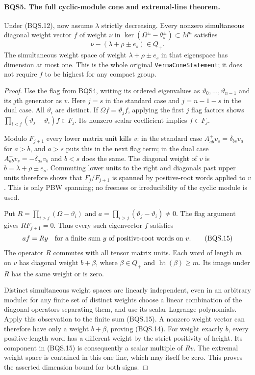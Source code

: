 \documentclass[11pt,a4paper]{article}
\numberwithin{equation}{section}
\theoremstyle{remark}\newtheorem{remark}[theorem]{Remark}
\begin{document}
\paragraph{BQS5. The full cyclic-module cone and extremal-line theorem.}
\label{claim:BQS5}
Under (BQS.12), now assume $\lambda$ strictly decreasing.  Every
nonzero simultaneous diagonal weight vector $f$ of weight $\nu$ in
$\ker(\Omega^\pm-\theta_s^\pm)\subset M^n$ satisfies
\[
              \nu-(\lambda+\rho\pm e_s)\in Q_+.
 \tag{BQS.14}
\]
The simultaneous weight space of weight $\lambda+\rho\pm e_s$ in
that eigenspace has dimension at most one.  This is the whole original
\texttt{Verma\allowbreak Cone\allowbreak Statement}; it does not require $f$ to be highest
for any compact group.

\begin{proof}
Use the flag from BQS4, writing its ordered eigenvalues as
$\vartheta_0,\ldots,\vartheta_{n-1}$ and its $j$th generator as $v$.
Here $j=s$ in the standard case and $j=n-1-s$ in the dual case.
All $\vartheta_i$ are distinct.  If $\Omega f=\vartheta_j f$,
applying the first $j$ flag factors shows
$\prod_{i<j}(\vartheta_j-\vartheta_i)f\in F_j$.
Its nonzero scalar coefficient implies $f\in F_j$.

Modulo $F_{j+1}$ every lower matrix unit kills $v$:
in the standard case $A^+_{ab}v_s=\delta_{bs}v_a$ for $a>b$,
and $a>s$ puts this in the next flag term; in the dual case
$A^-_{ab}v_s=-\delta_{as}v_b$ and $b<s$ does the same.
The diagonal weight of $v$ is $b=\lambda+\rho\pm e_s$.
Commuting lower units to the right and diagonals past upper units
therefore shows that $F_j/F_{j+1}$ is spanned by positive-root
words applied to $v$.  This is only PBW spanning; no freeness or
irreducibility of the cyclic module is used.

Put $R=\prod_{i>j}(\Omega-\vartheta_i)$ and
$a=\prod_{i>j}(\vartheta_j-\vartheta_i)\ne0$.
The flag argument gives $R F_{j+1}=0$.  Thus every such eigenvector
$f$ satisfies
\[
           a f=R y
 \quad\hbox{for a finite sum $y$ of positive-root words on $v$}.
 \tag{BQS.15}
\]
The operator $R$ commutes with all tensor matrix units.  Each word of
length $m$ on $v$ has diagonal weight $b+\beta$, where
$\beta\in Q_+$ and $\operatorname{ht}(\beta)\ge m$.
Its image under $R$ has the same weight or is zero.

Distinct simultaneous weight spaces are linearly independent, even in
an arbitrary module: for any finite set of distinct weights choose a
linear combination of the diagonal operators separating them, and use
its scalar Lagrange polynomials.  Apply this observation to the finite
sum (BQS.15).  A nonzero weight vector can therefore have only a weight
$b+\beta$, proving (BQS.14).
For weight exactly $b$, every positive-length word has a different
weight by the strict positivity of height.  Its component in (BQS.15)
is consequently a scalar multiple of $Rv$.
The extremal weight space is contained in this one line, which may
itself be zero.  This proves the asserted dimension bound for both signs.
\end{proof}
\end{document}
